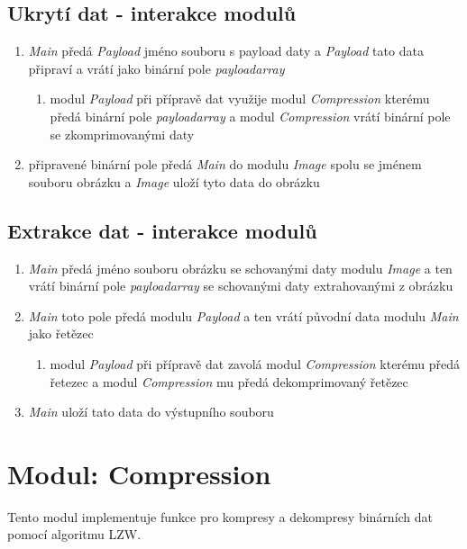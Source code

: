 \documentclass[12pt]{report}
\begin{document}
\subsection{Ukrytí dat - interakce modulů}
    \begin{enumerate}
        \item \textit{Main} předá \textit{Payload} jméno souboru s payload daty a \textit{Payload} tato data připraví a vrátí jako binární pole \textit{payloadarray}  
        \begin{enumerate}
            \item modul \textit{Payload} při přípravě dat využije modul \textit{Compression} kterému předá binární pole \textit{payloadarray} a modul \textit{Compression} vrátí binární pole se zkomprimovanými daty
        \end{enumerate}
        \item připravené binární pole předá \textit{Main} do modulu \textit{Image} spolu se jménem souboru obrázku a \textit{Image} uloží tyto data do obrázku
    \end{enumerate}
    
\subsection{Extrakce dat - interakce modulů}
    \begin{enumerate}
        \item \textit{Main} předá jméno souboru obrázku se schovanými daty modulu \textit{Image} a ten vrátí binární pole \textit{payloadarray}  se schovanými daty extrahovanými z obrázku
        \item \textit{Main} toto pole předá modulu \textit{Payload} a ten vrátí původní data modulu \textit{Main} jako řetězec
        \begin{enumerate}
            \item  modul \textit{Payload} při přípravě dat zavolá modul \textit{Compression} kterému předá řetezec a modul \textit{Compression} mu předá dekomprimovaný řetězec
        \end{enumerate}
        \item \textit{Main} uloží tato data do výstupního souboru
    \end{enumerate}

    \section{Modul: Compression}
    Tento modul implementuje funkce pro kompresy a dekompresy binárních dat pomocí algoritmu LZW.
\end{document}
